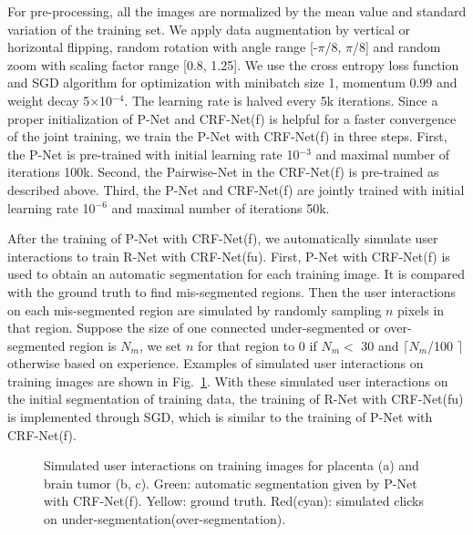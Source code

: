 \documentclass[10pt,journal,compsoc]{IEEEtran}
\begin{document}
For pre-processing, all the images are normalized by the mean value and standard variation of the training set. We apply data augmentation by vertical or horizontal flipping, random rotation with angle range [-$\pi$/8, $\pi$/8] and random zoom with scaling factor range [0.8, 1.25]. We use the cross entropy loss function and SGD algorithm for optimization with minibatch size 1, momentum 0.99 and weight decay 5$\times$10$^{-4}$. The learning rate is halved every 5k iterations. Since a proper initialization of P-Net and CRF-Net(f) is helpful for a faster convergence of the joint training, we train the P-Net with CRF-Net(f) in three steps. First, the P-Net is pre-trained with initial learning rate 10$^{-3}$ and maximal number of iterations 100k. Second, the Pairwise-Net in the CRF-Net(f) is pre-trained as described above. Third, the P-Net and CRF-Net(f) are jointly trained with initial learning rate 10$^{-6}$ and maximal number of iterations 50k.


After the training of P-Net with CRF-Net(f), we automatically simulate user interactions to train R-Net with CRF-Net(fu). First, P-Net with CRF-Net(f) is used to obtain an automatic segmentation for each training image. It is compared with the ground truth to find mis-segmented regions. Then the user interactions on each mis-segmented region are simulated by randomly sampling $n$ pixels in that region. Suppose the size of one connected under-segmented or over-segmented  region is $N_m$, we set $n$ for that region to 0 if $N_m<$ 30 and $\lceil N_m$/100 $\rceil$ otherwise based on experience. %
Examples of simulated user interactions on training images are shown in Fig.~\ref{fig:simulate_interaction}. With these simulated user interactions on the initial segmentation of training data, the training of R-Net with CRF-Net(fu) is implemented through SGD, which is similar to the training of P-Net with CRF-Net(f). %


\begin{figure}[t]
	\centering 
	\caption{
		Simulated user interactions on training images for placenta (a) and brain tumor (b, c). Green: automatic segmentation given by P-Net with CRF-Net(f). Yellow: ground truth. Red(cyan): simulated clicks on under-segmentation(over-segmentation).} 
	\label{fig:simulate_interaction}
\end{figure}
\end{document}
